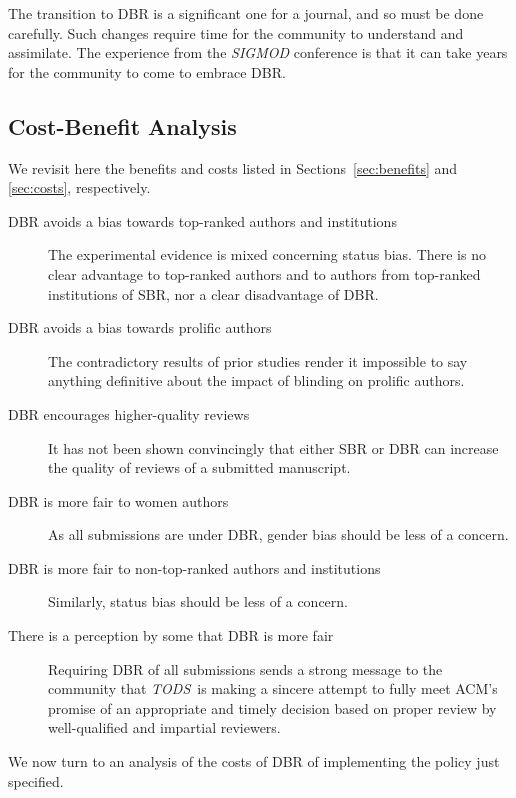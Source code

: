 \documentclass[acmtods,acmnow]{acmtrans2m}
\newcommand{\tods}{{\em TODS\/}}
\begin{document}
The transition to DBR is a significant one for a journal, and so must be
done carefully. Such changes require time for the community to understand
and assimilate. The experience from the {\em SIGMOD} conference is that it
can take years for the community to come to embrace DBR.

\subsection{Cost-Benefit Analysis}

We revisit here the benefits and costs listed in Sections~\ref{sec:benefits}
and \ref{sec:costs}, respectively.

\begin{description}
\item [DBR avoids a bias towards top-ranked authors and institutions] The
experimental evidence is mixed concerning status bias. There is no clear
advantage to top-ranked authors and to authors from top-ranked institutions of
SBR, nor a clear disadvantage of DBR.

\item[DBR avoids a bias towards prolific authors] The contradictory results
of prior studies render it impossible to say anything definitive about the
impact of blinding on prolific authors.

\item[DBR encourages higher-quality reviews] It has not been shown
convincingly that either SBR or DBR can increase the quality of reviews of a
submitted manuscript.

\item[DBR is more fair to women authors] As all submissions are under DBR,
gender bias should be less of a concern.
\item[DBR is more fair to non-top-ranked authors and institutions] Similarly,
status bias should be less of a concern.
\item[There is a perception by some that DBR is more fair] Requiring DBR of
all submissions sends a strong message to the community that \tods\ is
making a sincere attempt to fully meet ACM's promise of an appropriate and
timely decision based on proper review by well-qualified and impartial
reviewers.
\end{description}

We now turn to an analysis of the costs of DBR of implementing the policy
just specified.
\end{document}
